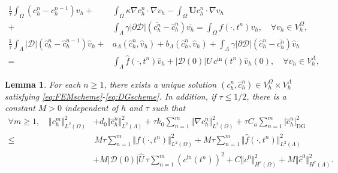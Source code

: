 \documentclass[10pt,a4paper]{amsart}
\newtheorem{lemma}{Lemma}
\newcommand{\DG}{\mathrm{DG}}
\newcommand{\bfU}{{\boldsymbol U}}
\newcommand\numberthis{\addtocounter{equation}{1}\tag{\theequation}}
\begin{document}
\begin{align}
    \frac{1}{\tau}\int_\Omega (c_h^{n}-c_h^{n-1}) v_h
      +  & \int_\Omega  \kappa \nabla c_h^{n} \cdot \nabla v_h  
       - \int_\Omega \bfU c_h^{n} \cdot \nabla v_h
   \nonumber\\
      +&\int_\Lambda\gamma \vert \partial\mathcal{D}\vert \left(\overline{c_h^{n}}-\hat{c}_h^{n}\right)\overline{v_h}
        = \int_\Omega f(\cdot,t^{n}) v_h, \quad \forall v_h \in V_h^\Omega,\label{eq:FEMscheme}\\
    \frac{1}{\tau} \int_\Lambda |\mathcal{D}|(\hat c_h^{n}- \hat c_h^{n-1}) \hat v_h 
    + & a_\Lambda(\hat c_h^{n}, \hat v_h)
    + b_\Lambda(\hat c_h^{n}, \hat v_h)
    +\int_\Lambda \gamma|\partial\mathcal{D}|\left(\hat c_h^{n}-\overline{c_h^{n}}\right)   \hat v_h
    \nonumber\\
   =  &  \int_\Lambda \hat f(\cdot, t^{n}) \hat v_h
   + |\mathcal{D}(0)|\hat U \, c^{\mathrm{in}}(t^n) \hat v_h(0),
   \quad \forall \hat v_h \in V_h^\Lambda,\label{eq:DGscheme}
\end{align}

\begin{lemma}
    For each $n\geq 1$, there exists a unique solution $(c_h^{n}, \hat c_h^{n})\in V_h^\Omega\times V_h^\Lambda$ satisfying \eqref{eq:FEMscheme}-\eqref{eq:DGscheme}.   In addition, %
    if $\tau \leq 1/2$, there is a constant $M>0$ independent of $h$ and $\tau$ such that
\begin{align}
\forall m\geq 1, \quad 
    \Vert c_h^m\Vert_{L^2(\Omega)}^2 
    & +d_0 \Vert \hat c_h^n\Vert_{L^2(\Lambda)}^2 
      +  \tau k_0 \sum_{n=1}^m \Vert \nabla c_h^n \Vert_{L^2(\Omega)}^2
      + \tau C_a \sum_{n=1}^m \vert \hat c_h^n \vert_{\DG}^2 \nonumber\\
        \leq  
        & \, M \tau \sum_{n=1}^m \Vert f(\cdot,t^n)\Vert_{L^2(\Omega)}^2
   + M \tau \sum_{n=1}^m \Vert \hat f(\cdot,t^n) \Vert_{L^2(\Lambda)}^2 
   \nonumber\\
&   + M |\mathcal{D}(0)|\hat U \, \tau \sum_{n=1}^{m}(c^{\mathrm{in}}(t^n))^2
+ C \Vert c^{0}\Vert_{H^s(\Omega)}^2 
+ M \Vert \hat c^{0}\Vert_{H^r(\Lambda)}^2.
\label{eq:stability}
\end{align}
\end{lemma}
\end{document}
